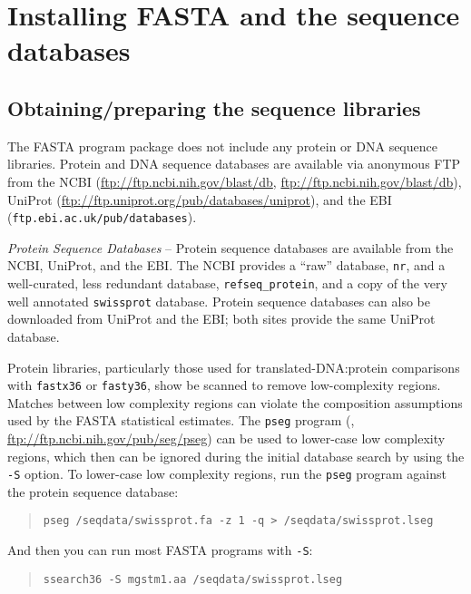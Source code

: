 \documentclass[11pt]{article}
\begin{document}
\section{Installing FASTA and the sequence databases}

\subsection{Obtaining/preparing the sequence libraries}

The FASTA program package does not include any protein or DNA sequence
libraries.  Protein and DNA sequence databases are available via
anonymous FTP from the NCBI (\url{ftp://ftp.ncbi.nih.gov/blast/db},
\url{ftp://ftp.ncbi.nih.gov/blast/db}), UniProt
(\url{ftp://ftp.uniprot.org/pub/databases/uniprot}), and the EBI
(\texttt{ftp.ebi.ac.uk/pub/databases}).

\emph{Protein Sequence Databases} -- Protein sequence databases are
available from the NCBI, UniProt, and the EBI.  The NCBI provides a
``raw'' database, \texttt{nr}, and a well-curated, less redundant
database, \texttt{refseq\_protein}, and a copy of the very well
annotated \texttt{swissprot} database. Protein sequence databases can
also be downloaded from UniProt and the EBI; both sites provide the
same UniProt\cite{uniprot11} database.

Protein libraries, particularly those used for translated-DNA:protein
comparisons with \texttt{fastx36} or \texttt{fasty36}, show be scanned
to remove low-complexity regions.  Matches between low complexity
regions can violate the composition assumptions used by the FASTA
statistical estimates. The \texttt{pseg} program (\cite{woo935},
\url{ftp://ftp.ncbi.nih.gov/pub/seg/pseg}) can be used to lower-case
low complexity regions, which then can be ignored during the initial
database search by using the \texttt{-S} option.  To lower-case low
complexity regions, run the \texttt{pseg} program against the protein sequence database:
\begin{quote}
\begin{verbatim}
pseg /seqdata/swissprot.fa -z 1 -q > /seqdata/swissprot.lseg
\end{verbatim}
\end{quote}
And then you can run most FASTA programs with \texttt{-S}:
\begin{quote}
\begin{verbatim}
ssearch36 -S mgstm1.aa /seqdata/swissprot.lseg
\end{verbatim}
\end{quote}
\end{document}
